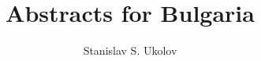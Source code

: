 \documentclass[12pt]{article}
\begin{document}
\title{Abstracts for Bulgaria}
\author{Stanislav S. Ukolov}
\maketitle




\end{document}
